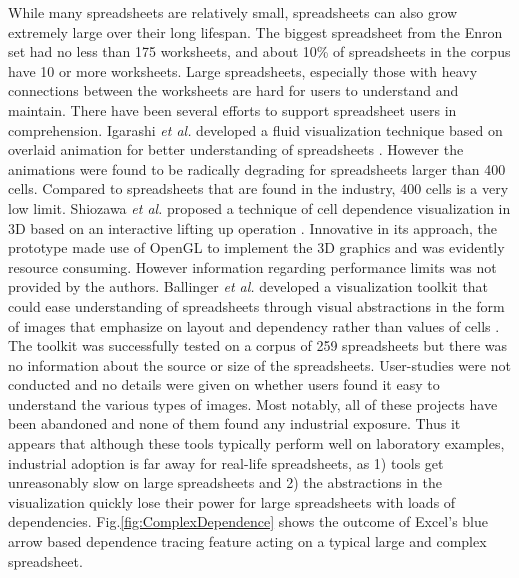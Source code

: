 \documentclass[conference]{IEEEtran}
\begin{document}
While many spreadsheets are relatively small, spreadsheets can also grow extremely large over their long lifespan. The biggest spreadsheet from the Enron set had no less than 175 worksheets, and about 10\% of spreadsheets in the corpus have 10 or more worksheets. Large spreadsheets, especially those with heavy connections between the worksheets are hard for users to understand and maintain. There have been several efforts to support spreadsheet users in comprehension. Igarashi \textit{et al.} developed a fluid visualization technique based on overlaid animation for better understanding of spreadsheets \cite{igarashi1998fluid}. However the animations were found to be radically degrading for spreadsheets larger than 400 cells. Compared to spreadsheets that are found in the industry, 400 cells is a very low limit. Shiozawa \textit{et al.} proposed a technique of cell dependence visualization in 3D based on an interactive lifting up operation \cite{shiozawa19993d}. Innovative in its approach, the prototype made use of OpenGL to implement the 3D graphics and was evidently resource consuming. However information regarding performance limits was not provided by the authors. Ballinger \textit{et al.} developed a visualization toolkit that could ease understanding of spreadsheets through visual abstractions in the form of images that emphasize on layout and dependency rather than values of cells \cite{ballinger2003spreadsheet}. The toolkit was successfully tested on a corpus of 259 spreadsheets but there was no information about the source or size of the spreadsheets. User-studies were not conducted and no details were given on whether users found it easy to understand the various types of images. Most notably, all of these projects have been abandoned and none of them found any industrial exposure. Thus it appears that although these tools typically perform well on laboratory examples, industrial adoption is far away for real-life spreadsheets, as 1) tools get unreasonably slow on large spreadsheets and 2) the abstractions in the visualization quickly lose their power for large spreadsheets with loads of dependencies. Fig.\ref{fig:ComplexDependence} shows the outcome of Excel's blue arrow based dependence tracing feature acting on a typical large and complex spreadsheet.
\end{document}

